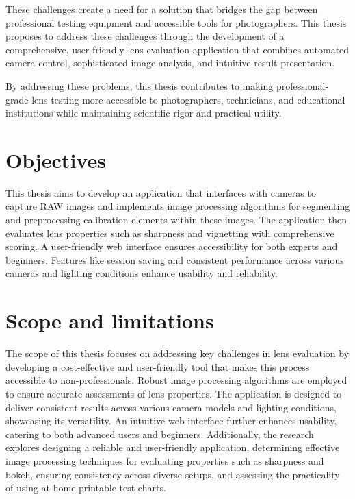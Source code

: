 These challenges create a need for a solution that bridges the gap between professional testing equipment and accessible tools for photographers. This thesis proposes to address these challenges through the development of a comprehensive, user-friendly lens evaluation application that combines automated camera control, sophisticated image analysis, and intuitive result presentation.


By addressing these problems, this thesis contributes to making professional-grade lens testing more accessible to photographers, technicians, and educational institutions while maintaining scientific rigor and practical utility.

\section*{Objectives}
This thesis aims to develop an application that interfaces with cameras to capture RAW images and implements image processing algorithms for segmenting and preprocessing calibration elements within these images. The application then evaluates lens properties such as sharpness and vignetting with comprehensive scoring. A user-friendly web interface ensures accessibility for both experts and beginners. Features like session saving and consistent performance across various cameras and lighting conditions enhance usability and reliability.

\section*{Scope and limitations}

The scope of this thesis focuses on addressing key challenges in lens evaluation by developing a cost-effective and user-friendly tool that makes this process accessible to non-professionals. Robust image processing algorithms are employed to ensure accurate assessments of lens properties. The application is designed to deliver consistent results across various camera models and lighting conditions, showcasing its versatility. An intuitive web interface further enhances usability, catering to both advanced users and beginners. Additionally, the research explores designing a reliable and user-friendly application, determining effective image processing techniques for evaluating properties such as sharpness and bokeh, ensuring consistency across diverse setups, and assessing the practicality of using at-home printable test charts.

